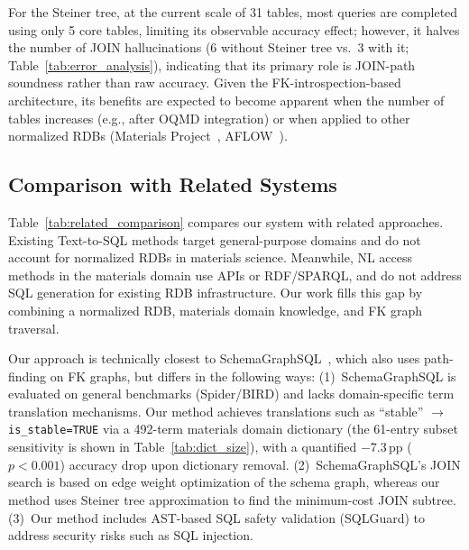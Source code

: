 \documentclass{npj-compt.mater}
\begin{document}
For the Steiner tree, at the current scale of 31 tables, most
queries are completed using only 5 core tables, limiting its
observable accuracy effect; however, it halves the number of
JOIN hallucinations (6 without Steiner tree vs.~3 with it;
Table~\ref{tab:error_analysis}), indicating that its primary role
is JOIN-path soundness rather than raw accuracy.
Given the FK-introspection-based architecture, its benefits are
expected to become apparent when the number of tables increases
(e.g., after OQMD integration) or when applied to other
normalized RDBs (Materials Project~\cite{jain2013mp},
AFLOW~\cite{curtarolo2012aflow}).

\subsection{Comparison with Related Systems}

Table~\ref{tab:related_comparison} compares our system with
related approaches.
Existing Text-to-SQL methods target general-purpose domains and
do not account for normalized RDBs in materials science.
Meanwhile, NL access methods in the materials domain use APIs or
RDF/SPARQL, and do not address SQL generation for existing RDB
infrastructure.
Our work fills this gap by combining a normalized RDB, materials
domain knowledge, and FK graph traversal.

Our approach is technically closest to
SchemaGraphSQL~\cite{safdarian2026schemagraphsql}, which also
uses path-finding on FK graphs, but differs in the following ways:
(1)~SchemaGraphSQL is evaluated on general benchmarks (Spider/BIRD)
and lacks domain-specific term translation mechanisms.
Our method achieves translations such as
``stable'' $\to$ \texttt{is\_stable=TRUE} via a 492-term materials
 domain dictionary (the 61-entry subset sensitivity is shown in
Table~\ref{tab:dict_size}), with a quantified $-$7.3\,pp ($p<0.001$)
accuracy drop upon dictionary removal.
(2)~SchemaGraphSQL's JOIN search is based on edge weight
optimization of the schema graph, whereas our method uses Steiner
tree approximation to find the minimum-cost JOIN subtree.
(3)~Our method includes AST-based SQL safety validation (SQLGuard)
to address security risks such as SQL injection.
\end{document}
